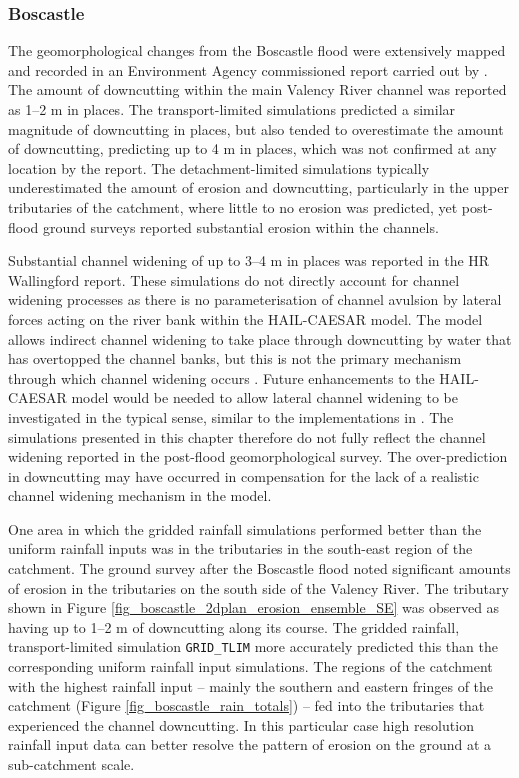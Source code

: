 \subsubsection{Boscastle}
The geomorphological changes from the Boscastle flood were extensively mapped and recorded in an Environment Agency commissioned report carried out by \citet{wallingford2005flooding}. The amount of downcutting within the main Valency River channel was reported as 1--2 m in places. The transport-limited simulations predicted  a similar magnitude of downcutting in places, but also tended to overestimate the amount of downcutting, predicting up to 4 m in places, which was not confirmed at any location by the \citet{wallingford2005flooding} report. The detachment-limited simulations typically underestimated the amount of erosion and downcutting, particularly in the upper tributaries of the catchment, where little to no erosion was predicted, yet post-flood ground surveys reported substantial erosion within the channels. 

Substantial channel widening of up to 3--4 m in places was reported in the HR Wallingford report. These simulations do not directly account for channel widening processes as there is no parameterisation of channel avulsion by lateral forces acting on the river bank within the HAIL-CAESAR model. The model allows indirect channel widening to take place through downcutting by water that has overtopped the channel banks, but this is not the primary mechanism through which channel widening occurs \citep{parker1976cause}. Future enhancements to the HAIL-CAESAR model would be needed to allow lateral channel widening to be investigated in the typical sense, similar to the implementations in \citet{murray1997properties,Coulthard2013}. The simulations presented in this chapter therefore do not fully reflect the channel widening reported in the post-flood geomorphological survey. The over-prediction in downcutting may have occurred in compensation for the lack of a realistic channel widening mechanism in the model.

One area in which the gridded rainfall simulations performed better than the uniform rainfall inputs was in the tributaries in the south-east region of the catchment. The ground survey after the Boscastle flood noted significant amounts of erosion in the tributaries on the south side of the Valency River. The tributary shown in Figure \ref{fig_boscastle_2dplan_erosion_ensemble_SE} was observed as having up to 1--2 m of downcutting along its course. The gridded rainfall, transport-limited simulation \texttt{GRID\_TLIM} more accurately predicted this than the corresponding uniform rainfall input simulations. The regions of the catchment with the highest rainfall input -- mainly the southern and eastern fringes of the catchment (Figure \ref{fig_boscastle_rain_totals}) -- fed into the tributaries that experienced the channel downcutting. In this particular case high resolution rainfall input data can better resolve the pattern of erosion on the ground at a sub-catchment scale.

